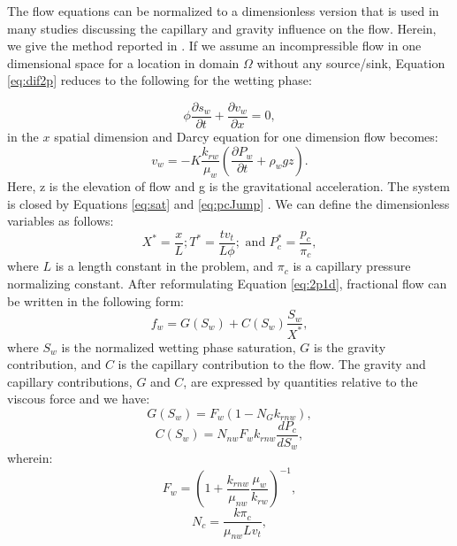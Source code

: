 The flow equations can be normalized to a dimensionless version that is used in
many studies discussing the capillary and gravity influence on the flow.
Herein, we give the method reported in \cite{fayers1959effect}. If we assume an
incompressible flow in one dimensional space for a location in domain $\Omega$
without any source/sink, Equation \ref{eq:dif2p} reduces to the following for
the wetting phase:

 \begin{equation}
  \phi \frac{\partial s_{w}}{\partial t}+ \frac {\partial v_w} {\partial x}=0,
  \label{eq:2p1d}
 \end{equation} in the $x$ spatial dimension and Darcy equation for one
dimension
flow becomes:
 \begin{equation}
  v_w=-K\frac{k_{rw}}{\mu_w}(\frac{\partial P_w}{\partial t} + \rho_w g z).
  \label{eq:D1d}
 \end{equation} Here, z is the elevation of flow and g is the gravitational
acceleration. The system is closed by Equations \ref{eq:sat} and \ref{eq:pcJump}
. We can define the dimensionless variables as follows:
 \begin{equation}
  X^*=\frac{x}{L};T^*=\frac{tv_t}{L\phi};\mbox{ and }P^*_c=\frac{p_c}{\pi_c},
  \label{eq:var*}
 \end{equation} where $L$ is a length constant in the problem, and $\pi_c$ is a
capillary pressure normalizing constant. After reformulating Equation
\ref{eq:2p1d}, fractional flow can be written in the following form:
 \begin{equation}
  f_w=G(S_w)+C(S_w)\frac{S_w}{X^*},
 \end{equation} where $S_w$ is the normalized wetting phase saturation, $G$ is
the gravity contribution, and $C$ is the capillary contribution to
the flow. The gravity and capillary contributions, $G$ and $C$, are expressed
by quantities relative to the viscous force \cite{hadley1956theoretical} and we
have:
 \begin{equation}
  G(S_w)=F_w(1-N_Gk_{rnw}),
  \label{eq:GrCont}
 \end{equation}
 \begin{equation}
  C(S_w)=N_{nw}F_wk_{rnw}\frac{dP_{c}}{dS_w},
  \label{eq:PcCont}
 \end{equation} wherein: 
 \begin{equation}
  F_w=(1+\frac{k_{rnw}}{\mu_{nw}}\frac{\mu_w}{k_{rw}})^{-1},
  \label{eq:Fn}
 \end{equation}
 \begin{equation}
  N_c=\frac{k\pi_c}{\mu_{nw}Lv_t},
  \label{eq:Nc}
 \end{equation}

